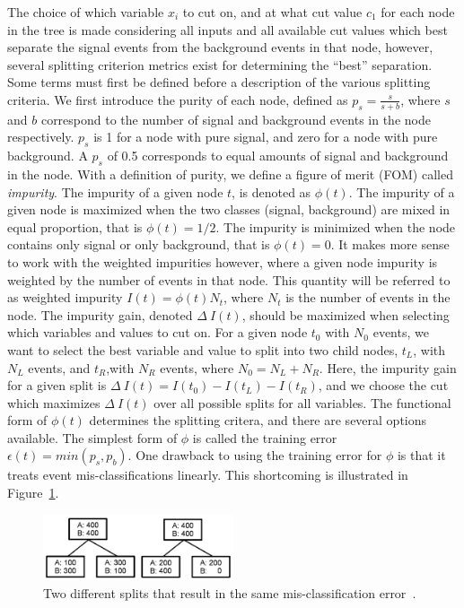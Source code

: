 The choice of which variable $x_{i}$ to cut on, and at what cut value $c_{1}$ for each node
in the tree is made considering all inputs and all available cut values which best separate the signal events from the background events in that node, however, 
several splitting criterion metrics exist for determining the ``best'' separation. 
Some terms must first be defined before a description of the various splitting criteria.
We first introduce the purity of each node, defined as $p_{s}=\frac{s}{s+b}$, where $s$ and $b$ correspond to the number of signal and background
events in the node respectively. $p_{s}$ is 1 for a node with pure signal, and zero for a node with pure background. A $p_{s}$ of 0.5 corresponds to equal amounts
of signal and background in the node.
With a definition of purity, we define a figure of merit (FOM) called \textit{impurity}. The impurity of a given node $t$, is denoted as $\phi(t)$.
The impurity of a given node is maximized when the two classes (signal, background) are mixed in equal proportion, that is $\phi(t) = 1/2$.
The impurity is minimized when the node contains only signal or only background, that is $\phi(t) = 0$.
It makes more sense to work with the weighted impurities however, where a given node impurity is weighted by the number of events in that node. This quantity
will be referred to as weighted impurity $I(t) = \phi(t)N_{t}$, where $N_{t}$ is the number of events in the node. 
The impurity gain, denoted $\Delta~I(t)$, should be maximized when selecting which variables and values to cut on. For a given node $t_{0}$ with $N_{0}$ events, we want to
select the best variable and value to split into two child nodes, $t_{L}$, with $N_{L}$ events, and $t_{R}$,with $N_{R}$ events, where $N_{0} = N_{L} + N_{R}$. Here, the
impurity gain for a given split is $\Delta~I(t) = I(t_{0}) - I(t_{L}) - I(t_{R})$, and we choose the cut which maximizes $\Delta~I(t)$ over all possible splits for all variables.
The functional form of $\phi(t)$ determines the splitting critera, and there are several options available.
The simplest form of $\phi$ is called the training error $\epsilon(t) = min(p_{s},p_{b})$.
One drawback to using the training error for $\phi$ is that it treats event mis-classifications linearly. This shortcoming is illustrated in Figure~\ref{fig:tree_split}.

\begin{figure}[hbtp]
 \begin{center}
   \includegraphics[width=0.5\textwidth]{ap1_figs/tree_split.pdf}
   \caption[Two splits with the same error rate.]{Two different splits that result in the same mis-classification error~\cite{illya}.}
   \label{fig:tree_split}
 \end{center}
\end{figure}

